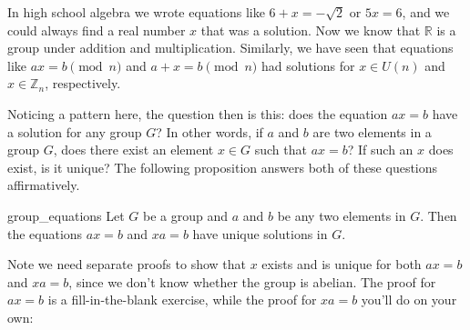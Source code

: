  
In high school algebra we wrote equations like $6 + x = -\sqrt{2}$ or $5x = 6$, and we could always find a real number $x$ that was a solution.  Now we know that ${\mathbb R}$ is a group under addition and multiplication.  Similarly, we have seen that  equations like $ax = b \pmod{n}$ and $a + x = b \pmod{n}$ had solutions for $x \in U(n)$ and $x \in {\mathbb Z}_n$, respectively. 

Noticing a pattern here, the question then is this:  does the equation $ax = b$ have a solution for any group $G$? 
In other words, if $a$ and $b$ are two elements in a group $G$, does there 
exist an element $x \in G$ such that $ax = b$? If such an $x$ does
exist, is it unique? The following proposition answers both of these
questions affirmatively. 
  
\begin{prop}{group_equations}
Let $G$ be a group and $a$ and $b$ be any two elements in $G$. Then
the equations $ax = b$ and $xa = b$ have unique solutions in $G$. 
\end{prop}

\noindent
Note we need separate proofs to show that $x$ exists and is unique for both $ax =b$ and $xa = b$, since we don't know whether the group is abelian.  The proof for $ax=b$ is a fill-in-the-blank exercise, while the proof for $xa=b$ you'll do on your own:

